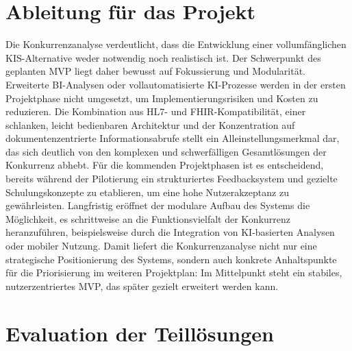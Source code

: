 \section{Ableitung für das Projekt}
Die Konkurrenzanalyse verdeutlicht, dass die Entwicklung einer vollumfänglichen KIS-Alternative weder notwendig noch realistisch ist. Der Schwerpunkt des geplanten MVP liegt daher bewusst auf Fokussierung und Modularität. Erweiterte BI-Analysen oder vollautomatisierte KI-Prozesse werden in der ersten Projektphase nicht umgesetzt, um Implementierungsrisiken und Kosten zu reduzieren. Die Kombination aus HL7- und FHIR-Kompatibilität, einer schlanken, leicht bedienbaren Architektur und der Konzentration auf dokumentenzentrierte Informationsabrufe stellt ein Alleinstellungsmerkmal dar, das sich deutlich von den komplexen und schwerfälligen Gesamtlösungen der Konkurrenz abhebt.
Für die kommenden Projektphasen ist es entscheidend, bereits während der Pilotierung ein strukturiertes Feedbacksystem und gezielte Schulungskonzepte zu etablieren, um eine hohe Nutzerakzeptanz zu gewährleisten. Langfristig eröffnet der modulare Aufbau des Systems die Möglichkeit, es schrittweise an die Funktionsvielfalt der Konkurrenz heranzuführen, beispielsweise durch die Integration von KI-basierten Analysen oder mobiler Nutzung. Damit liefert die Konkurrenzanalyse nicht nur eine strategische Positionierung des Systems, sondern auch konkrete Anhaltspunkte für die Priorisierung im weiteren Projektplan: Im Mittelpunkt steht ein stabiles, nutzerzentriertes MVP, das später gezielt erweitert werden kann.
\section{Evaluation der Teillösungen}
